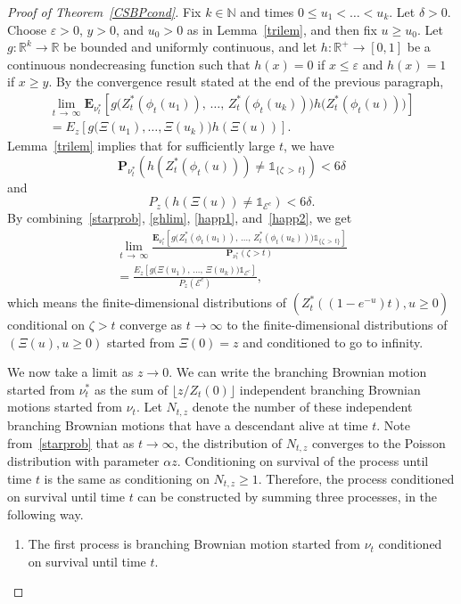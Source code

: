 \documentclass[10pt]{amsart}
\theoremstyle{definition}\newtheorem{defi}[theo]{Definition}\newtheorem{rema}[theo]{Remark}\newtheorem{exam}[theo]{Example}\newtheorem{exem}[theo]{Example}\newtheorem{nota}[theo]{Notation}
\newcommand*\eps{\varepsilon}
\newcommand*\E{\mathbf{E}}
\renewcommand*\P{\mathbf{P}}
\newcommand{\clE}{\mathcal{E}}
\newcommand*\N{\mathbb{N}}
\newcommand*\R{\mathbb{R}}
\newcommand{\1} {\mathds{1}}
\begin{document}
\begin{proof}[Proof of Theorem~\ref{CSBPcond}]
Fix $k \in \N$ and times $0 \leq u_1 < \dots < u_k$. Let $\delta > 0$. Choose $\eps > 0$, $y > 0$, and $u_0 > 0$ as in Lemma~\ref{trilem}, and then fix $u \geq u_0$. Let $g: \R^k \rightarrow \R$ be bounded and uniformly continuous, and let $h: \R^+ \rightarrow [0,1]$ be a continuous nondecreasing function such that $h(x) = 0$ if $x \leq \eps$ and $h(x) = 1$ if $x \geq y$. By the convergence result stated at the end of the previous paragraph,
\begin{multline}\label{ghlim}
\lim_{t\,\rightarrow\,\infty} \E_{\nu_t^*}\left[g\big(Z_t^*\left(\phi_t(u_1)\right),\,\dots,\, Z_t^*\left(\phi_t(u_k)\right)\big)h\big(Z_t^*\left(\phi_t(u)\right)\big)\right] \\
= E_z\left[g\big(\Xi(u_1), \dots, \Xi(u_k)\big) h(\Xi(u))\right].
\end{multline}
Lemma~\ref{trilem} implies that for sufficiently large $t$, we have
\begin{equation}\label{happ1}
\P_{\nu_t^*}\left(h\left(Z_t^*\left(\phi_t(u)\right)\right) \neq \1_{\{\zeta\,>\,t\}}\right) < 6 \delta
\end{equation}
and
\begin{equation}\label{happ2}
P_z\left(h(\Xi(u)) \neq \1_{\clE^c}\right) < 6 \delta.
\end{equation}
By combining~\eqref{starprob}, \eqref{ghlim}, \eqref{happ1}, and~\eqref{happ2}, we get
\begin{multline}\label{condlim}
\lim_{t\,\rightarrow\,\infty} \frac{\E_{\nu_t^*}\left[g\big(Z_t^*\left(\phi_t(u_1)\right),\, \dots,\, Z_t^*\left(\phi_t(u_k)\right)\big) \1_{\{\zeta\,>\,t\}}\right]}{\P_{\nu_t^*}(\zeta > t)} \\
= \frac{E_{z}\left[g\big(\Xi(u_1),\, \dots,\, \Xi(u_k)\big) \1_{\clE^c}\right]}{P_{z}\left(\clE^c\right)},
\end{multline}
which means the finite-dimensional distributions of $(Z_t^*((1 - e^{-u})t), u \geq 0)$ conditional on $\zeta > t$ converge as $t \rightarrow \infty$ to the finite-dimensional distributions of $(\Xi(u), u \geq 0)$ started from $\Xi(0) = z$ and conditioned to go to infinity.

We now take a limit as $z \rightarrow 0$. We can write the branching Brownian motion started from $\nu_t^*$ as the sum of $\lfloor z/Z_t(0) \rfloor$ independent branching Brownian motions started from $\nu_t$. Let $N_{t,z}$ denote the number of these independent branching Brownian motions that have a descendant alive at time $t$. Note from~\eqref{starprob} that as $t \rightarrow \infty$, the distribution of $N_{t,z}$ converges to the Poisson distribution with parameter $\alpha z$. Conditioning on survival of the process until time $t$ is the same as conditioning on $N_{t,z} \geq 1$. Therefore, the process conditioned on survival until time $t$ can be constructed by summing three processes, in the following way.
\begin{enumerate}
\item The first process is branching Brownian motion started from $\nu_t$ conditioned on survival until time $t$.


\end{enumerate}
\end{proof}
\end{document}
